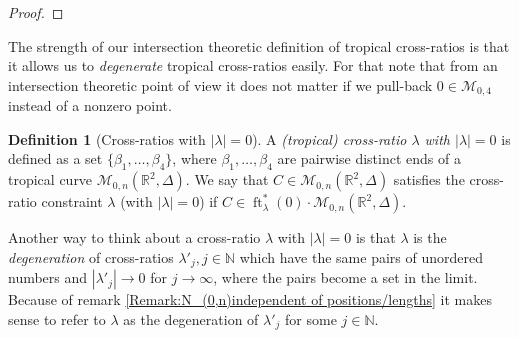 \documentclass[11pt,reqno,a4]{amsart}
\theoremstyle{dotless}
\theoremstyle{definition}
\newtheorem{definition}[corollary]{Definition}
\newcommand{\ft}{\operatorname{ft}}
\newcommand{\coker}{\operatorname{coker}}
\begin{document}
\begin{proof}
\begin{table}[H]
\end{table}
\end{proof}




The strength of our intersection theoretic definition of tropical cross-ratios is that it allows us to \textit{degenerate} tropical cross-ratios easily. For that note that from an intersection theoretic point of view it does not matter if we pull-back $0\in\mathcal{M}_{0,4}$ instead of a nonzero point.

\begin{definition}[Cross-ratios with $|\lambda|=0$]
A \textit{(tropical) cross-ratio $\lambda$ with $|\lambda|=0$} is defined as a set $\lbrace \beta_1,\dots,\beta_4\rbrace$, where $\beta_1,\dots,\beta_4$ are pairwise distinct ends of a tropical curve $\mathcal{M}_{0,n}\left(\mathbb{R}^2,\Delta \right)$. We say that $C\in\mathcal{M}_{0,n}\left(\mathbb{R}^2,\Delta \right)$ satisfies the cross-ratio constraint $\lambda$ (with $|\lambda|=0$) if $C\in\ft^*_\lambda\left(0 \right)\cdot \mathcal{M}_{0,n}\left(\mathbb{R}^2,\Delta \right)$.

Another way to think about a cross-ratio $\lambda$ with $|\lambda|=0$ is that $\lambda$ is the \textit{degeneration} of cross-ratios $\lambda'_j, j\in\mathbb{N}$ which have the same pairs of unordered numbers and $|\lambda'_j|\to 0$ for $j\to \infty$, where the pairs become a set in the limit. Because of remark \ref{Remark:N_(0,n)independent of positions/lengths} it makes sense to refer to $\lambda$ as the degeneration of $\lambda'_j$ for some $j\in\mathbb{N}$.
\end{definition}
\end{document}
